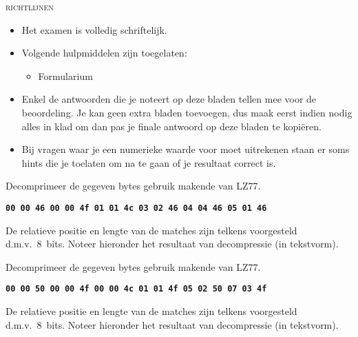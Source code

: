 \documentclass[]{pvm-exam}
\newcommand{\hex}[1]{\texttt{\bfseries #1}}
\begin{document}
\begin{examguidelines}
  \begin{center}
    \textsc{\Huge richtlijnen}
  \end{center}
  \vskip1cm
  \Large
  \begin{itemize}
    \item Het examen is volledig schriftelijk.
    \item Volgende hulpmiddelen zijn toegelaten:
          \begin{itemize}
            \item Formularium
          \end{itemize}
    \item Enkel de antwoorden die je noteert op deze bladen
          tellen mee voor de beoordeling. Je kan geen extra bladen
          toevoegen, dus maak eerst indien nodig alles in klad om dan pas
          je finale antwoord op deze bladen te kopi\"eren.
    \item Bij vragen waar je een numerieke waarde voor moet uitrekenen
          staan er soms hints die je toelaten om na te gaan of je resultaat correct is.
  \end{itemize}
\end{examguidelines}







\begin{question}
  Decomprimeer de gegeven bytes gebruik makende van LZ77.
  \begin{center}
    \hex{00 00 46 00 00 4f 01 01 4c 03 02 46 04 04 46 05 01 46}
  \end{center}
  De relatieve positie en lengte van de matches zijn telkens voorgesteld d.m.v.~8~bits.
  Noteer hieronder het resultaat van decompressie (in tekstvorm).
  \vskip5mm
  \begin{center}
  \end{center}
\end{question}

\begin{question}
  Decomprimeer de gegeven bytes gebruik makende van LZ77.
  \begin{center}
    \hex{00 00 50 00 00 4f 00 00 4c 01 01 4f 05 02 50 07 03 4f}
  \end{center}
  De relatieve positie en lengte van de matches zijn telkens voorgesteld d.m.v.~8~bits.
  Noteer hieronder het resultaat van decompressie (in tekstvorm).
  \vskip5mm
  \begin{center}
  \end{center}
\end{question}
\end{document}

